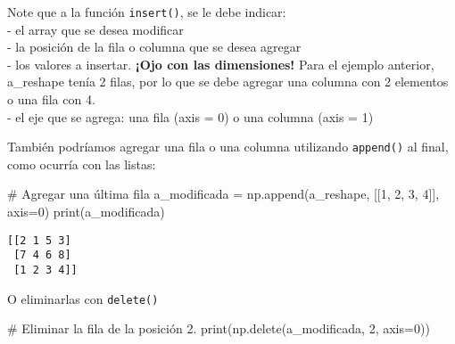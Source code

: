 \documentclass[
  letterpaper,
  DIV=11,
  numbers=noendperiod]{scrreprt}
\newenvironment{Shaded}{\begin{snugshade}}{\end{snugshade}}
\newcommand{\BuiltInTok}[1]{\textcolor[rgb]{0.00,0.23,0.31}{#1}}
\newcommand{\CommentTok}[1]{\textcolor[rgb]{0.37,0.37,0.37}{#1}}
\newcommand{\DecValTok}[1]{\textcolor[rgb]{0.68,0.00,0.00}{#1}}
\newcommand{\NormalTok}[1]{\textcolor[rgb]{0.00,0.23,0.31}{#1}}
\newcommand{\OperatorTok}[1]{\textcolor[rgb]{0.37,0.37,0.37}{#1}}
\begin{document}
\begin{tcolorbox}[enhanced jigsaw, colframe=quarto-callout-note-color-frame, leftrule=.75mm, titlerule=0mm, left=2mm, bottomtitle=1mm, arc=.35mm, opacitybacktitle=0.6, toptitle=1mm, colbacktitle=quarto-callout-note-color!10!white, opacityback=0, breakable, title=\textcolor{quarto-callout-note-color}{\faInfo}\hspace{0.5em}{\textbf{Observemos los parámetros}\\
}, toprule=.15mm, rightrule=.15mm, colback=white, coltitle=black, bottomrule=.15mm]

Note que a la función \texttt{insert()}, se le debe indicar:\\
- el array que se desea modificar\\
- la posición de la fila o columna que se desea agregar\\
- los valores a insertar. \textbf{¡Ojo con las dimensiones!} Para el
ejemplo anterior, a\_reshape tenía 2 filas, por lo que se debe agregar
una columna con 2 elementos o una fila con 4.\\
- el eje que se agrega: una fila (axis = 0) o una columna (axis = 1)\\

\end{tcolorbox}

También podríamos agregar una fila o una columna utilizando
\texttt{append()} al final, como ocurría con las listas:

\begin{Shaded}
\begin{Highlighting}[]
\CommentTok{\# Agregar una última fila}
\NormalTok{a\_modificada }\OperatorTok{=}\NormalTok{ np.append(a\_reshape, [[}\DecValTok{1}\NormalTok{, }\DecValTok{2}\NormalTok{, }\DecValTok{3}\NormalTok{, }\DecValTok{4}\NormalTok{]], axis}\OperatorTok{=}\DecValTok{0}\NormalTok{)}
\BuiltInTok{print}\NormalTok{(a\_modificada)}
\end{Highlighting}
\end{Shaded}

\begin{verbatim}
[[2 1 5 3]
 [7 4 6 8]
 [1 2 3 4]]
\end{verbatim}

O eliminarlas con \texttt{delete()}

\begin{Shaded}
\begin{Highlighting}[]
\CommentTok{\# Eliminar la fila de la posición 2.}
\BuiltInTok{print}\NormalTok{(np.delete(a\_modificada, }\DecValTok{2}\NormalTok{, axis}\OperatorTok{=}\DecValTok{0}\NormalTok{))}
\end{Highlighting}
\end{Shaded}
\end{document}
